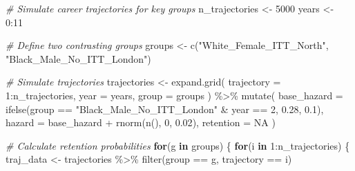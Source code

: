 \documentclass[
]{article}
\newenvironment{Shaded}{\begin{snugshade}}{\end{snugshade}}
\newcommand{\AttributeTok}[1]{\textcolor[rgb]{0.77,0.63,0.00}{#1}}
\newcommand{\CommentTok}[1]{\textcolor[rgb]{0.56,0.35,0.01}{\textit{#1}}}
\newcommand{\ConstantTok}[1]{\textcolor[rgb]{0.00,0.00,0.00}{#1}}
\newcommand{\ControlFlowTok}[1]{\textcolor[rgb]{0.13,0.29,0.53}{\textbf{#1}}}
\newcommand{\DecValTok}[1]{\textcolor[rgb]{0.00,0.00,0.81}{#1}}
\newcommand{\FloatTok}[1]{\textcolor[rgb]{0.00,0.00,0.81}{#1}}
\newcommand{\FunctionTok}[1]{\textcolor[rgb]{0.00,0.00,0.00}{#1}}
\newcommand{\NormalTok}[1]{#1}
\newcommand{\OtherTok}[1]{\textcolor[rgb]{0.56,0.35,0.01}{#1}}
\newcommand{\SpecialCharTok}[1]{\textcolor[rgb]{0.00,0.00,0.00}{#1}}
\newcommand{\StringTok}[1]{\textcolor[rgb]{0.31,0.60,0.02}{#1}}
\begin{document}
\begin{Shaded}
\begin{Highlighting}[]
\CommentTok{\# Simulate career trajectories for key groups}
\NormalTok{n\_trajectories }\OtherTok{\textless{}{-}} \DecValTok{5000}
\NormalTok{years }\OtherTok{\textless{}{-}} \DecValTok{0}\SpecialCharTok{:}\DecValTok{11}

\CommentTok{\# Define two contrasting groups}
\NormalTok{groups }\OtherTok{\textless{}{-}} \FunctionTok{c}\NormalTok{(}\StringTok{"White\_Female\_ITT\_North"}\NormalTok{, }\StringTok{"Black\_Male\_No\_ITT\_London"}\NormalTok{)}

\CommentTok{\# Simulate trajectories}
\NormalTok{trajectories }\OtherTok{\textless{}{-}} \FunctionTok{expand.grid}\NormalTok{(}
  \AttributeTok{trajectory =} \DecValTok{1}\SpecialCharTok{:}\NormalTok{n\_trajectories,}
  \AttributeTok{year =}\NormalTok{ years,}
  \AttributeTok{group =}\NormalTok{ groups}
\NormalTok{) }\SpecialCharTok{\%\textgreater{}\%}
  \FunctionTok{mutate}\NormalTok{(}
    \AttributeTok{base\_hazard =} \FunctionTok{ifelse}\NormalTok{(group }\SpecialCharTok{==} \StringTok{"Black\_Male\_No\_ITT\_London"} \SpecialCharTok{\&}\NormalTok{ year }\SpecialCharTok{==} \DecValTok{2}\NormalTok{, }\FloatTok{0.28}\NormalTok{, }\FloatTok{0.1}\NormalTok{),}
    \AttributeTok{hazard =}\NormalTok{ base\_hazard }\SpecialCharTok{+} \FunctionTok{rnorm}\NormalTok{(}\FunctionTok{n}\NormalTok{(), }\DecValTok{0}\NormalTok{, }\FloatTok{0.02}\NormalTok{),}
    \AttributeTok{retention =} \ConstantTok{NA}
\NormalTok{  )}

\CommentTok{\# Calculate retention probabilities}
\ControlFlowTok{for}\NormalTok{(g }\ControlFlowTok{in}\NormalTok{ groups) \{}
  \ControlFlowTok{for}\NormalTok{(i }\ControlFlowTok{in} \DecValTok{1}\SpecialCharTok{:}\NormalTok{n\_trajectories) \{}
\NormalTok{    traj\_data }\OtherTok{\textless{}{-}}\NormalTok{ trajectories }\SpecialCharTok{\%\textgreater{}\%}
      \FunctionTok{filter}\NormalTok{(group }\SpecialCharTok{==}\NormalTok{ g, trajectory }\SpecialCharTok{==}\NormalTok{ i)}
    

\end{Highlighting}
\end{Shaded}
\end{document}
